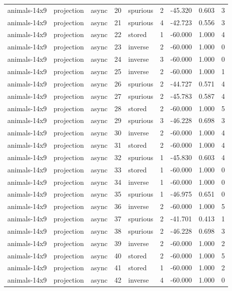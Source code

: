 \begin{tabular}{lllrlrrrr}
animals-14x9 & projection & async & 20 & spurious & 2 & -45.320 & 0.603 & 3 \\
animals-14x9 & projection & async & 21 & spurious & 4 & -42.723 & 0.556 & 3 \\
animals-14x9 & projection & async & 22 & stored & 1 & -60.000 & 1.000 & 4 \\
animals-14x9 & projection & async & 23 & inverse & 2 & -60.000 & 1.000 & 0 \\
animals-14x9 & projection & async & 24 & inverse & 3 & -60.000 & 1.000 & 0 \\
animals-14x9 & projection & async & 25 & inverse & 2 & -60.000 & 1.000 & 1 \\
animals-14x9 & projection & async & 26 & spurious & 2 & -44.727 & 0.571 & 4 \\
animals-14x9 & projection & async & 27 & spurious & 2 & -45.783 & 0.587 & 4 \\
animals-14x9 & projection & async & 28 & stored & 2 & -60.000 & 1.000 & 5 \\
animals-14x9 & projection & async & 29 & spurious & 3 & -46.228 & 0.698 & 3 \\
animals-14x9 & projection & async & 30 & inverse & 2 & -60.000 & 1.000 & 4 \\
animals-14x9 & projection & async & 31 & stored & 2 & -60.000 & 1.000 & 4 \\
animals-14x9 & projection & async & 32 & spurious & 1 & -45.830 & 0.603 & 4 \\
animals-14x9 & projection & async & 33 & stored & 1 & -60.000 & 1.000 & 0 \\
animals-14x9 & projection & async & 34 & inverse & 1 & -60.000 & 1.000 & 0 \\
animals-14x9 & projection & async & 35 & spurious & 1 & -46.975 & 0.651 & 0 \\
animals-14x9 & projection & async & 36 & inverse & 2 & -60.000 & 1.000 & 5 \\
animals-14x9 & projection & async & 37 & spurious & 2 & -41.701 & 0.413 & 1 \\
animals-14x9 & projection & async & 38 & spurious & 2 & -46.228 & 0.698 & 3 \\
animals-14x9 & projection & async & 39 & inverse & 2 & -60.000 & 1.000 & 2 \\
animals-14x9 & projection & async & 40 & stored & 2 & -60.000 & 1.000 & 5 \\
animals-14x9 & projection & async & 41 & stored & 1 & -60.000 & 1.000 & 2 \\
animals-14x9 & projection & async & 42 & inverse & 4 & -60.000 & 1.000 & 0 \\

\end{tabular}

